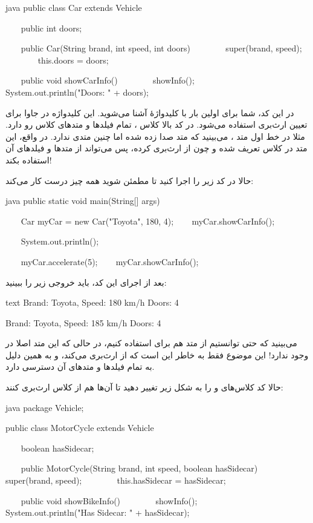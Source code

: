 \begin{codebox}{java}
public class Car extends Vehicle {
    public int doors;

    public Car(String brand, int speed, int doors) {
        super(brand, speed);
        this.doors = doors;  
    }

    public void showCarInfo() {  
        showInfo();  
        System.out.println("Doors: " + doors);  
    }  
}
\end{codebox}

در این کد، شما برای اولین بار با کلیدواژهٔ  آشنا
می‌شوید. این کلیدواژه در جاوا برای تعیین ارث‌بری استفاده می‌شود. در کد بالا
کلاس  ، تمام فیلدها و متدهای کلاس 
رو دارد. مثلا در خط اول متد  ، می‌بینید که متد
 صدا زده شده اما  چنین متدی
ندارد. در واقع، این متد در کلاس  تعریف شده و چون
 از  ارث‌بری کرده، پس می‌تواند از
متدها و فیلدهای آن استفاده بکند!

حالا در  کد زیر را اجرا کنید تا مطمئن شوید همه چیز
درست کار می‌کند:

\begin{codebox}{java}
public static void main(String[] args) {  
    Car myCar = new Car("Toyota", 180, 4);  
    myCar.showCarInfo();  
  
    System.out.println();  
  
    myCar.accelerate(5);  
    myCar.showCarInfo();  
}
\end{codebox}

بعد از اجرای این کد، باید خروجی زیر را ببینید:

\begin{codebox}{text}
Brand: Toyota, Speed: 180 km/h  
Doors: 4  

Brand: Toyota, Speed: 185 km/h  
Doors: 4
\end{codebox}

می‌بینید که حتی توانستیم از متد  هم برای
 استفاده کنیم، در حالی که این متد اصلا در
 وجود ندارد! این موضوع فقط به خاطر این است که
 از  ارث‌بری می‌کند، و به همین دلیل
به تمام فیلدها و متدهای آن دسترسی دارد.

حالا کد‌ کلاس‌های  و  را به شکل
زیر تغییر دهید تا آن‌ها هم از کلاس  ارث‌بری کنند:

\begin{codebox}{java}
package Vehicle;

public class MotorCycle extends Vehicle {
    boolean hasSidecar;

    public MotorCycle(String brand, int speed, boolean hasSidecar) {
        super(brand, speed);
        this.hasSidecar = hasSidecar;  
    }

    public void showBikeInfo() {  
        showInfo();  
        System.out.println("Has Sidecar: " + hasSidecar);  
    }  
}
\end{codebox}

